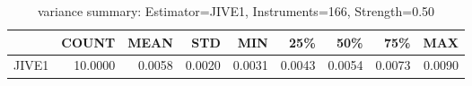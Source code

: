 \begin{table}[ht]
\centering
\caption{variance summary: Estimator=JIVE1, Instruments=166, Strength=0.50}
\begin{tabular}{lrrrrrrrr}
\toprule
 & COUNT & MEAN & STD & MIN & 25\% & 50\% & 75\% & MAX \\
\midrule
JIVE1 & 10.0000 & 0.0058 & 0.0020 & 0.0031 & 0.0043 & 0.0054 & 0.0073 & 0.0090 \\
\bottomrule
\end{tabular}
\end{table}
